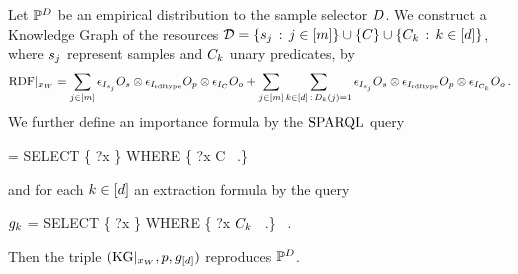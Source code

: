 \begin{theorem}
    \label{the:reproducingKGSingelObjects}
    Let $\mathbb{P}^{D}$ be an empirical distribution to the sample selector $D$.
    We construct a Knowledge Graph of the resources $\mathcal{D} = \{s_j \,:\, j\in[m]\} \cup \{C\} \cup \{C_k \,:\, k\in[d]\}$, where $s_{j}$ represent samples and $C_k$ unary predicates, by
    \begin{align*}
        {\mathrm{RDF}}|_{x_{W}}
        =
        \sum_{j\in[m]}
        \epsilon_{I_{s_j}}{O_{s}}
        \otimes \epsilon_{I_{\mathrm{rdf}\mathrm{type}}}{O_{p}}
        \otimes \epsilon_{I_{C}}{O_{o}}
        +
        \sum_{j\in[m]} \sum_{k\in[d] \,:\, D_{k}(j)=1}
        \epsilon_{I_{s_j}}{O_{s}}
        \otimes \epsilon_{I_{\mathrm{rdf}\mathrm{type}}}{O_{p}}
        \otimes \epsilon_{I_{C_k}}{O_{o}} \, .
    \end{align*}
    We further define an importance formula by the $\mathrm{SPARQL}$ query
    \begin{centeredscript}
        \impformula = SELECT \{ ?x \} WHERE \{ ?x \quad \rdftype\quad C \, .\}
    \end{centeredscript}
    and for each $k\in[d]$ an extraction formula by the query
    \begin{centeredscript}
        $g_{k}$ = SELECT \{ ?x \} WHERE \{ ?x \quad \rdftype \quad $C_k$ \, .\} \, .
    \end{centeredscript}
    Then the triple $(\mathrm{KG}|_{x_{W}},p,g_{[d]})$ reproduces $\mathbb{P}^{D}$.
\end{theorem}
